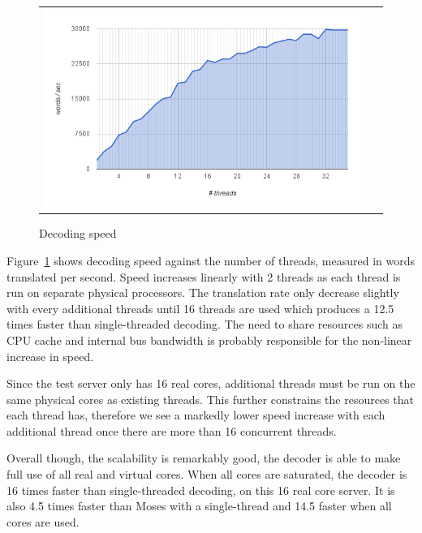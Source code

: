 \documentclass[11pt]{article}
\begin{document}
\begin{figure}[h]
\centering
\begin{tabular}{cc}
{\includegraphics[scale=0.4]{scalability.png}} 
\end{tabular}
\caption{Decoding speed}
\label{fig:speed}
\end{figure} 

Figure~\ref{fig:speed} shows decoding speed against the number of threads, measured in words translated per second. Speed increases linearly with 2 threads as each thread is run on separate physical processors. The translation rate only decrease slightly with every additional threads until 16 threads are used which produces a 12.5 times faster than single-threaded decoding. The need to share resources such as CPU cache and internal bus bandwidth is probably responsible for the non-linear increase in speed.

Since the test server only has 16 real cores, additional threads must be run on the same physical cores as existing threads. This further constrains the resources that each thread has, therefore we see a markedly lower speed increase with each additional thread once there are more than 16 concurrent threads.

Overall though, the scalability is remarkably good, the decoder is able to make full use of all real and virtual cores. When all cores are saturated, the decoder is 16 times faster than single-threaded decoding, on this 16 real core server. It is also 4.5 times faster than Moses with a single-thread and 14.5 faster when all cores are used.
\end{document}
